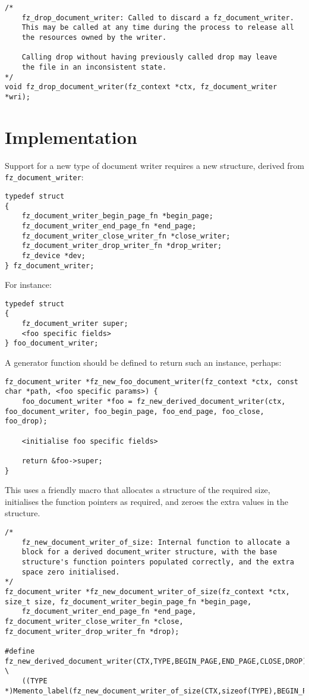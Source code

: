 \documentclass[oneside]{book}
\begin{document}
\begin{lstlisting}
/*
	fz_drop_document_writer: Called to discard a fz_document_writer.
	This may be called at any time during the process to release all
	the resources owned by the writer.

	Calling drop without having previously called drop may leave
	the file in an inconsistent state.
*/
void fz_drop_document_writer(fz_context *ctx, fz_document_writer *wri);
\end{lstlisting}

\section{Implementation}

Support for a new type of document writer requires a new structure, derived from \texttt{fz\_document\_writer}:

\begin{lstlisting}
typedef struct
{
	fz_document_writer_begin_page_fn *begin_page;
	fz_document_writer_end_page_fn *end_page;
	fz_document_writer_close_writer_fn *close_writer;
	fz_document_writer_drop_writer_fn *drop_writer;
	fz_device *dev;
} fz_document_writer;
\end{lstlisting}

For instance:

\begin{lstlisting}
typedef struct
{
	fz_document_writer super;
	<foo specific fields>
} foo_document_writer;
\end{lstlisting}

A generator function should be defined to return such an instance, perhaps:

\begin{lstlisting}
fz_document_writer *fz_new_foo_document_writer(fz_context *ctx, const char *path, <foo specific params>) {
    foo_document_writer *foo = fz_new_derived_document_writer(ctx, foo_document_writer, foo_begin_page, foo_end_page, foo_close, foo_drop);

    <initialise foo specific fields>

    return &foo->super;
}
\end{lstlisting}

This uses a friendly macro that allocates a structure of the required size, initialises the function pointers as required, and zeroes the extra values in the structure.

\begin{lstlisting}
/*
	fz_new_document_writer_of_size: Internal function to allocate a
	block for a derived document_writer structure, with the base
	structure's function pointers populated correctly, and the extra
	space zero initialised.
*/
fz_document_writer *fz_new_document_writer_of_size(fz_context *ctx, size_t size, fz_document_writer_begin_page_fn *begin_page,
	fz_document_writer_end_page_fn *end_page, fz_document_writer_close_writer_fn *close, fz_document_writer_drop_writer_fn *drop);

#define fz_new_derived_document_writer(CTX,TYPE,BEGIN_PAGE,END_PAGE,CLOSE,DROP) \
	((TYPE *)Memento_label(fz_new_document_writer_of_size(CTX,sizeof(TYPE),BEGIN_PAGE,END_PAGE,CLOSE,DROP),#TYPE))
\end{lstlisting}
\end{document}
